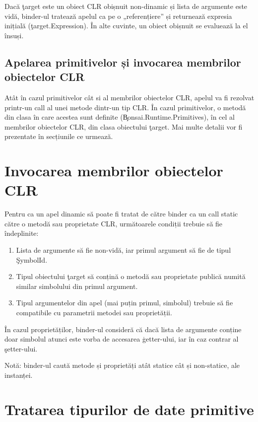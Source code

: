 \documentclass[12pt,a4paper]{memoir}
\begin{document}
Dacă \c{target} este un obiect CLR obișnuit non-dinamic și lista de argumente este vidă, binder-ul tratează apelul ca pe o „referențiere” și returnează expresia inițială (\c{target.Expression}). În alte cuvinte, un obiect obișnuit se evaluează la el însuși.

\subsection{Apelarea primitivelor și invocarea membrilor obiectelor CLR}

Atât în cazul primitivelor cât si al membrilor obiectelor CLR, apelul va fi rezolvat printr-un call al unei metode dintr-un tip CLR. În cazul primitivelor, o metodă din clasa în care acestea sunt definite (\c{Bonsai.Runtime.Primitives}), în cel al membrilor obiectelor CLR, din clasa obiectului \c{target}. Mai multe detalii vor fi prezentate în secțiunile ce urmează.

\section{Invocarea membrilor obiectelor CLR}\label{sec:invoking_clr_members}

Pentru ca un apel dinamic să poate fi tratat de către binder ca un call static către o metodă sau proprietate CLR, următoarele condiții trebuie să fie îndeplinite:

\begin{enumerate}
\item Lista de argumente să fie non-vidă, iar primul argument să fie de tipul \c{SymbolId}.
\item Tipul obiectului \c{target} să conțină o metodă sau proprietate publică numită similar simbolului din primul argument.
\item Tipul argumentelor din apel (mai puțin primul, simbolul) trebuie să fie compatibile cu parametrii metodei sau proprietății.
\end{enumerate}

În cazul proprietăților, binder-ul consideră că dacă lista de argumente conține doar simbolul atunci este vorba de accesarea \c{getter}-ului, iar în caz contrar al \c{setter}-ului. 

Notă: binder-ul caută metode și proprietăți atât statice cât și non-statice, ale instanței. 

\section{Tratarea tipurilor de date primitive}\label{ch:runtime_sec:primitives}
\end{document}
